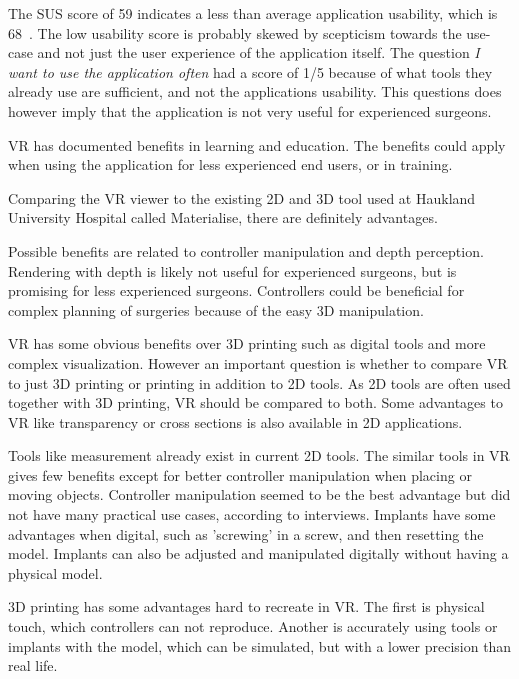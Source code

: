 \documentclass[a4paper]{report}
\begin{document}
The SUS score of 59 indicates a less than average application usability, which is 68~\cite{system_usability_scale_sus_system_2013}. The low usability score is probably skewed by scepticism towards the use-case and not just the user experience of the application itself. The question \emph{I want to use the application often} had a score of 1/5 because of what tools they already use are sufficient, and not the applications usability. This questions does however imply that the application is not very useful for experienced surgeons.

VR has documented benefits in learning and education. The benefits could apply when using the application for less experienced end users, or in training.


Comparing the VR viewer to the existing 2D and 3D tool used at Haukland University Hospital called Materialise, there are definitely advantages.

Possible benefits are related to controller manipulation and depth perception. Rendering with depth is likely not useful for experienced surgeons, but is promising for less experienced surgeons.
Controllers could be beneficial for complex planning of surgeries because of the easy 3D manipulation.

VR has some obvious benefits over 3D printing such as digital tools and more complex visualization.
However an important question is whether to compare VR to just 3D printing or printing in addition to 2D tools. As 2D tools are often used together with 3D printing, VR should be compared to both. Some advantages to VR like transparency or cross sections is also available in 2D applications.

Tools like measurement already exist in current 2D tools. The similar tools in VR gives few benefits except for better controller manipulation when placing or moving objects.
Controller manipulation seemed to be the best advantage but did not have many practical use cases, according to interviews.
Implants have some advantages when digital, such as 'screwing' in a screw, and then resetting the model. Implants can also be adjusted and manipulated digitally without having a physical model.

3D printing has some advantages hard to recreate in VR. The first is physical touch, which controllers can not reproduce. Another is accurately using tools or implants with the model, which can be simulated, but with a lower precision than real life.
\end{document}
